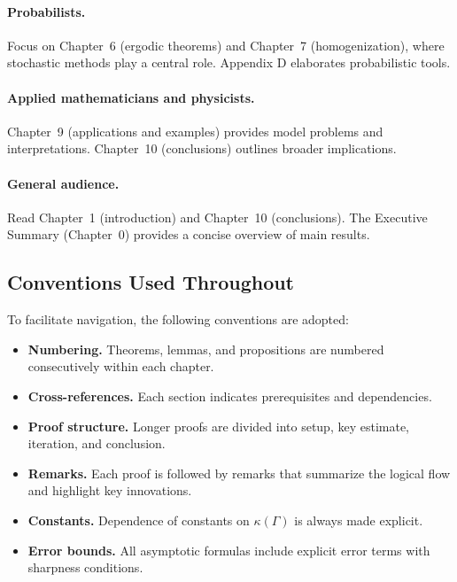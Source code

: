 \paragraph{Probabilists.}
Focus on Chapter~6 (ergodic theorems) and Chapter~7 (homogenization), where
stochastic methods play a central role. Appendix D elaborates probabilistic
tools.

\paragraph{Applied mathematicians and physicists.}
Chapter~9 (applications and examples) provides model problems and
interpretations. Chapter~10 (conclusions) outlines broader implications.

\paragraph{General audience.}
Read Chapter~1 (introduction) and Chapter~10 (conclusions). The Executive
Summary (Chapter~0) provides a concise overview of main results.

\subsection{Conventions Used Throughout}

To facilitate navigation, the following conventions are adopted:

\begin{itemize}
  \item \textbf{Numbering.} Theorems, lemmas, and propositions are numbered
  consecutively within each chapter.
  \item \textbf{Cross-references.} Each section indicates prerequisites and
  dependencies.
  \item \textbf{Proof structure.} Longer proofs are divided into setup, key
  estimate, iteration, and conclusion.
  \item \textbf{Remarks.} Each proof is followed by remarks that summarize the
  logical flow and highlight key innovations.
  \item \textbf{Constants.} Dependence of constants on $\kappa(\Gamma)$ is
  always made explicit.
  \item \textbf{Error bounds.} All asymptotic formulas include explicit error
  terms with sharpness conditions.
\end{itemize}

